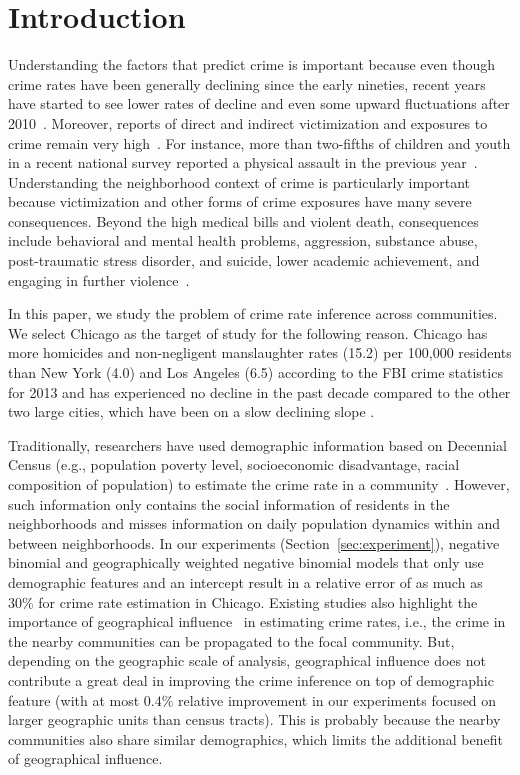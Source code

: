 
\section{Introduction}

Understanding the factors that predict crime is important because even though crime rates have been generally declining since the early nineties, recent years have started to see lower rates of decline and even some upward fluctuations after 2010~\cite{BJS16}. Moreover, reports of direct and indirect victimization and exposures to crime remain very high~\cite{TjLl15}. For instance, more than two-fifths of children and youth in a recent national survey reported a physical assault in the previous year~\cite{FTSH13}.  Understanding the neighborhood context of crime is particularly important because victimization and other forms of crime exposures have many severe consequences.  Beyond the high medical bills and violent death, consequences include behavioral and mental health problems, aggression, substance abuse, post-traumatic stress disorder, and suicide, lower academic achievement, and engaging in further violence~\cite{Grai15}.

In this paper, we study the problem of crime rate inference across communities. We select Chicago as the target of study for the following reason. Chicago has more homicides and non-negligent manslaughter rates (15.2) per 100,000 residents than New York (4.0) and Los Angeles (6.5) according to the FBI crime statistics for 2013 and has experienced no decline in the past decade compared to the other two large cities, which have been on a slow declining slope \cite{crime-stats}.


Traditionally, researchers have used demographic information based on Decennial Census (e.g., population poverty level, socioeconomic disadvantage, racial composition of population) to estimate the crime rate in a community~\cite{GrSa09}. However,  such information only contains the social information of residents in the neighborhoods and misses information on daily population dynamics within and between neighborhoods. In our experiments (Section~\ref{sec:experiment}), negative binomial and geographically weighted negative binomial models that only use demographic features and an intercept result in a relative error of as much as 30\% for crime rate estimation in Chicago. Existing studies also highlight the importance of geographical influence~\cite{Ans02} in estimating crime rates, i.e., the crime in the nearby communities can be propagated to the focal community. But, depending on the geographic scale of analysis, geographical influence does not contribute a great deal in improving the crime inference on top of demographic feature (with at most $0.4\%$ relative improvement in our experiments focused on larger geographic units than census tracts). This is probably because the nearby communities also share similar demographics, which limits the additional benefit of geographical influence.
 
